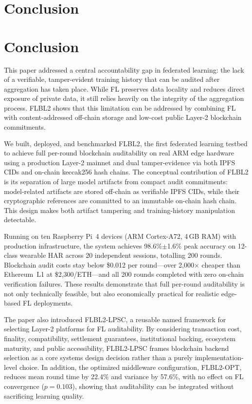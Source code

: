 \documentclass{llncs}
\begin{document}
\section{Conclusion}
\label{sec:conclusion}

\section{Conclusion}

This paper addressed a central accountability gap in federated learning: the lack of a verifiable, tamper-evident training history that can be audited after aggregation has taken place. While FL preserves data locality and reduces direct exposure of private data, it still relies heavily on the integrity of the aggregation process. FLBL2 shows that this limitation can be addressed by combining FL with content-addressed off-chain storage and low-cost public Layer-2 blockchain commitments.

We built, deployed, and benchmarked FLBL2, the first federated learning testbed to achieve full per-round blockchain auditability on real ARM edge hardware using a production Layer-2 mainnet and dual tamper-evidence via both IPFS CIDs and on-chain keccak256 hash chains. The conceptual contribution of FLBL2 is its separation of large model artifacts from compact audit commitments: model-related artifacts are stored off-chain as verifiable IPFS CIDs, while their cryptographic references are committed to an immutable on-chain hash chain. This design makes both artifact tampering and training-history manipulation detectable.

Running on ten Raspberry Pi~4 devices (ARM Cortex-A72, 4\,GB RAM) with production infrastructure, the system achieves 98.6\%$\pm$1.6\% peak accuracy on 12-class wearable HAR across 20 independent sessions, totalling 200 rounds. Blockchain audit costs stay below \$0.012 per round---over 2{,}000$\times$ cheaper than Ethereum~L1 at \$2{,}300/ETH---and all 200 rounds completed with zero on-chain verification failures. These results demonstrate that full per-round auditability is not only technically feasible, but also economically practical for realistic edge-based FL deployments.

The paper also introduced FLBL2-LPSC, a reusable named framework for selecting Layer-2 platforms for FL auditability. By considering transaction cost, finality, compatibility, settlement guarantees, institutional backing, ecosystem maturity, and public accessibility, FLBL2-LPSC frames blockchain backend selection as a core systems design decision rather than a purely implementation-level choice. In addition, the optimized middleware configuration, FLBL2-OPT, reduces mean round time by 22.4\% and variance by 57.6\%, with no effect on FL convergence ($p=0.103$), showing that auditability can be integrated without sacrificing learning quality.
\end{document}
